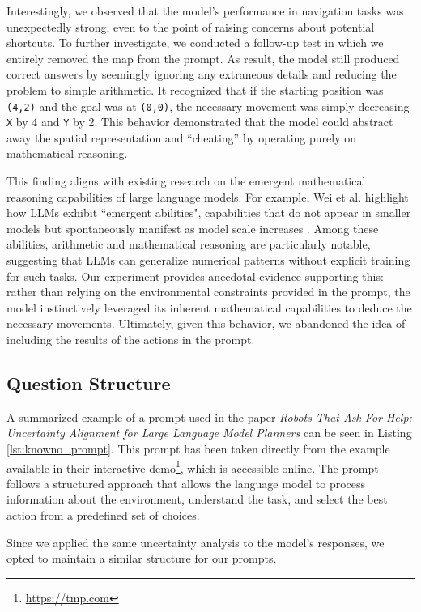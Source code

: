 Interestingly, we observed that the model's performance in navigation tasks was unexpectedly
strong, even to the point of raising concerns about potential shortcuts. To further
investigate, we conducted a follow-up test in which we entirely removed the map
from the prompt. As result, the model still produced correct answers by
seemingly ignoring any extraneous details and reducing the problem to simple
arithmetic. It recognized that if the starting position was \texttt{(4,2)} and
the goal was at \texttt{(0,0)}, the necessary movement was simply decreasing
\texttt{X} by 4 and \texttt{Y} by 2. This behavior demonstrated that the model
could abstract away the spatial representation and ``cheating'' by operating
purely on mathematical reasoning.

This finding aligns with existing research on the emergent mathematical
reasoning capabilities of large language models. For example, Wei et al. highlight
how LLMs exhibit ``emergent abilities", capabilities that do not appear in smaller
models but spontaneously manifest as model scale increases \cite{wei2022emergentabilitieslargelanguage}.
Among these abilities, arithmetic and mathematical reasoning are particularly notable,
suggesting that LLMs can generalize numerical patterns without explicit training
for such tasks. Our experiment provides anecdotal evidence supporting this:
rather than relying on the environmental constraints provided in the prompt, the
model instinctively leveraged its inherent mathematical capabilities to deduce the
necessary movements. Ultimately, given this behavior, we abandoned the idea of
including the results of the actions in the prompt.

\subsection{Question Structure}
\label{sub:question_structure}

A summarized example of a prompt used in the paper \emph{Robots That Ask For
Help: Uncertainty Alignment for Large Language Model Planners}
\cite{ren2023robotsaskhelpuncertainty} can be seen in Listing
\ref{lst:knowno_prompt}. This prompt has been taken directly from the example available
in their interactive demo\footnote{\url{https://tmp.com}}, which is accessible online.
The prompt follows a structured approach that allows the language model to
process information about the environment, understand the task, and select the
best action from a predefined set of choices.

Since we applied the same uncertainty analysis to the model's responses, we opted
to maintain a similar structure for our prompts.

